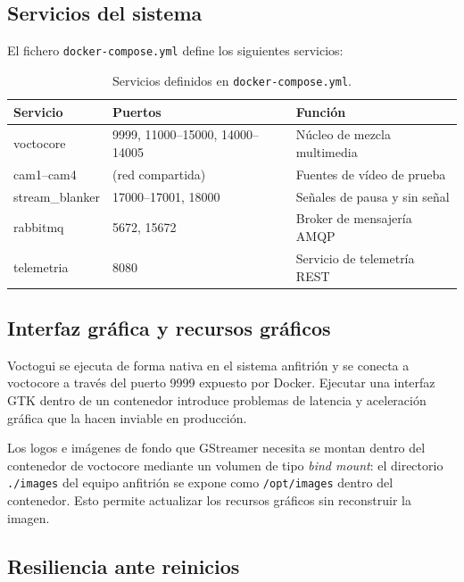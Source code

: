 \subsection{Servicios del sistema}

El fichero \texttt{docker-compose.yml} define los siguientes servicios:

\begin{table}[H]
  \centering
  \caption{Servicios definidos en \texttt{docker-compose.yml}.}
  \label{tab:servicios_docker}
  \small
  \begin{tabular}{|l|l|l|}
    \hline
    \textbf{Servicio} & \textbf{Puertos} & \textbf{Función} \\
    \hline
    voctocore        & 9999, 11000--15000, 14000--14005 & Núcleo de mezcla multimedia \\
    cam1--cam4       & (red compartida)                 & Fuentes de vídeo de prueba \\
    stream\_blanker  & 17000--17001, 18000              & Señales de pausa y sin señal \\
    rabbitmq         & 5672, 15672                      & Broker de mensajería AMQP \\
    telemetria       & 8080                             & Servicio de telemetría REST \\
    \hline
  \end{tabular}
\end{table}

\subsection{Interfaz gráfica y recursos gráficos}

Voctogui se ejecuta de forma nativa en el sistema anfitrión y se conecta a voctocore a
través del puerto 9999 expuesto por Docker. Ejecutar una interfaz GTK dentro de un
contenedor introduce problemas de latencia y aceleración gráfica que la hacen inviable
en producción.

Los logos e imágenes de fondo que GStreamer necesita se montan dentro del contenedor
de voctocore mediante un volumen de tipo \textit{bind mount}: el directorio
\texttt{./images} del equipo anfitrión se expone como \texttt{/opt/images} dentro del
contenedor. Esto permite actualizar los recursos gráficos sin reconstruir la imagen.

\subsection{Resiliencia ante reinicios}

